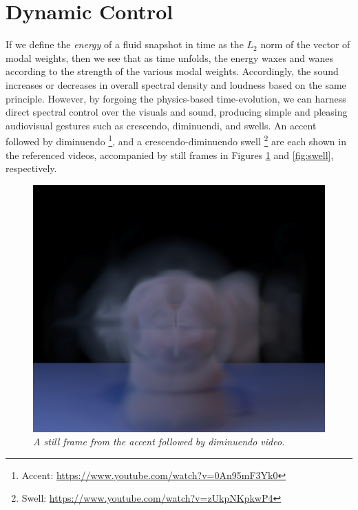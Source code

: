 \section{Dynamic Control}
If we define the {\em energy} of a fluid snapshot in time as the $L_2$ norm of the vector of modal weights, then we see that as time unfolds, the energy waxes and wanes according to the strength
of the various modal weights. Accordingly, the sound increases or decreases in overall spectral density and loudness based on the same principle. However, by forgoing the physics-based time-evolution,
we can harness direct spectral control over the visuals and sound, producing simple and pleasing audiovisual gestures such as crescendo, diminuendi, and swells. An accent followed by diminuendo \footnote{Accent: \url{https://www.youtube.com/watch?v=0An95mF3Yk0}}, and a crescendo-diminuendo swell \footnote{Swell: \url{https://www.youtube.com/watch?v=zUkpNKpkwP4}} are each shown in the referenced videos, accompanied by still frames in Figures \ref{fig:dim} and \ref{fig:swell}, respectively.

\begin{figure}[H]
	\centering
	\includegraphics[width=\textwidth]{chap6/figures/dim.png}
	\caption{\em A still frame from the accent followed by diminuendo video.}
\label{fig:dim}
\end{figure}

